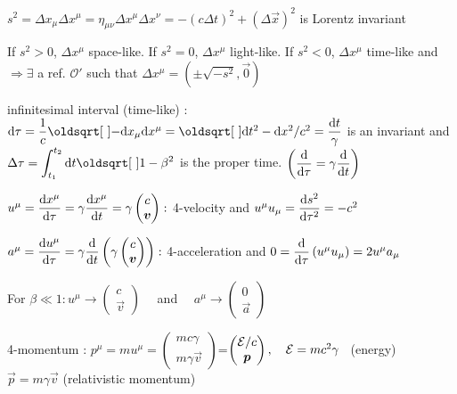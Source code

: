 \item $s^2 = \Delta x_\mu \Delta x^\mu = \eta_{\mu\nu} \Delta x^{\mu}\Delta x^{\nu} = -(c\Delta t)^2 + (\Delta \Vec{x})^2$ is Lorentz invariant

\item If $s^2>0$, $\Delta x^\mu$ space-like. If $s^2=0$, $\Delta x^\mu$ light-like. If $s^2<0$, $\Delta x^\mu$ time-like and $\Rightarrow \exists$ a ref. $\mathcal{O}'$ such that $\Delta x^{\mu} = \left( \pm \sqrt{-s^2} , \vec{0} \right)$\\

\item
infinitesimal interval (time-like) : $\ud \tau = \dfrac{1}{c}\sqrt{-\ud x_\mu\ud x^\mu} = \sqrt{\ud t^2 -\ud x^2/c^2} =\dfrac{\ud t}{\gamma} $
is an invariant and $\Delta\tau = {\displaystyle \int_{t_1}^{t_2}\ud t\sqrt{1-\beta^2} }$ is the proper time. $\left(\dfrac{\textrm{d} }{\textrm{d} \tau} = \gamma \dfrac{\textrm{d}}{\textrm{d} t}\right)$

\squishend
{}
\squishlist

\item $u^{\mu} = \dfrac{\textrm{d} x^{\mu}}{\textrm{d} \tau} = \gamma \dfrac{\textrm{d} x^{\mu}}{\textrm{d} t} = \gamma
\begin{pmatrix}
c \\
\mbox{\boldmath$v$}
\end{pmatrix} : $ 4-velocity and $u^{\mu}u_{\mu} = \dfrac{\textrm{d} s^2}{\textrm{d} \tau^2} = -c^2$

\item $a^{\mu} = \dfrac{\textrm{d} u^{\mu}}{\textrm{d} \tau}  = \gamma \dfrac{\textrm{d} }{\textrm{d}  t}\left(\gamma
\begin{pmatrix}
c \\
\mbox{\boldmath$v$}
\end{pmatrix}\right) : $ 4-acceleration and $ 0 = \dfrac{\textrm{d} }{\textrm{d} \tau}\left(u^{\mu}u_{\mu}\right) = 2u^{\mu}a_{\mu}$

\item For $\beta \ll 1 : u^{\mu} \rightarrow 
\begin{pmatrix}
c\\
\vec{v}
\end{pmatrix} \quad $ and $ \quad a^{\mu} \rightarrow
\begin{pmatrix}
0\\
\vec{a}
\end{pmatrix}$


\item 4-momentum : $p^{\mu} = m u^{\mu}= 
\begin{pmatrix}
    mc\gamma \\
    m\gamma \Vec{v}
\end{pmatrix}$=$\begin{pmatrix}
    \E/c \\
    \Vec{p}
\end{pmatrix}, \quad \E = mc^2\gamma $ \ (energy) \ $\vec{p} = m\gamma \Vec{v}$ (relativistic momentum)


